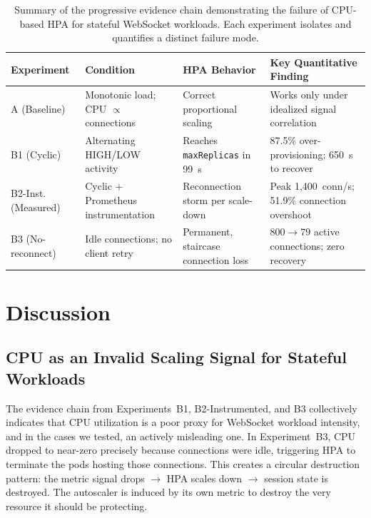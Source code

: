 \documentclass[twocolumn]{svjour3}
\begin{document}
\begin{table}[t]
\centering
\caption{Summary of the progressive evidence chain demonstrating the failure of CPU-based
HPA for stateful WebSocket workloads. Each experiment isolates and quantifies a distinct
failure mode.}
\label{tab:failure_summary}
\begin{tabular}{@{}p{2.2cm}p{3.5cm}p{3.5cm}p{5cm}@{}}
\toprule
\rowcolor{gray!12}
\textbf{Experiment} & \textbf{Condition} & \textbf{HPA Behavior} & \textbf{Key Quantitative Finding} \\
\midrule
A (Baseline) & Monotonic load; CPU $\propto$ connections & Correct proportional scaling & Works only under idealized signal correlation \\
B1 (Cyclic) & Alternating HIGH/LOW activity & Reaches \texttt{maxReplicas} in 99~s & 87.5\% over-provisioning; 650~s to recover \\
B2-Inst. (Measured) & Cyclic + Prometheus instrumentation & Reconnection storm per scale-down & Peak 1,400~conn/s; 51.9\% connection overshoot \\
B3 (No-reconnect) & Idle connections; no client retry & Permanent, staircase connection loss & $800{\rightarrow}79$ active connections; zero recovery \\
\bottomrule
\end{tabular}
\end{table}



\section{Discussion}
\label{sec:discussion}

\subsection{CPU as an Invalid Scaling Signal for Stateful Workloads}

The evidence chain from Experiments~B1, B2-Instrumented, and B3 collectively indicates
that CPU utilization is a poor proxy for WebSocket workload intensity, and in the cases
we tested, an actively misleading one.
In Experiment~B3, CPU dropped to near-zero precisely because connections were idle, triggering
HPA to terminate the pods hosting those connections. This creates a circular
destruction pattern: the metric signal drops $\rightarrow$ HPA scales down $\rightarrow$
session state is destroyed. The autoscaler is induced by its own metric to destroy the very
resource it should be protecting.
\end{document}
